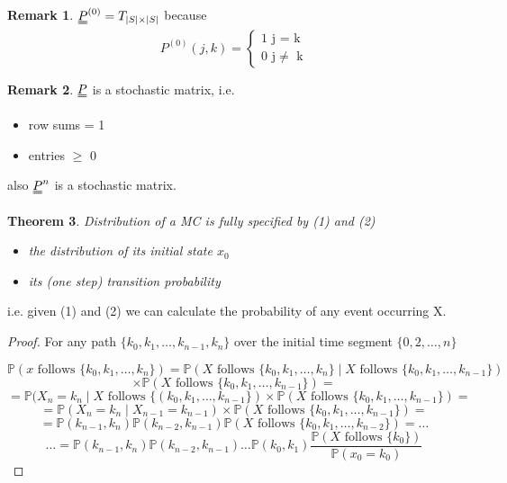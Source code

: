 \documentclass{article}
\newtheorem{thm}{Theorem}
\theoremstyle{definition}
\newtheorem{rem}[thm]{Remark}
\begin{document}
\begin{rem} $\uuline{P}^{(0)} = T_{\mid S \mid \times \mid S \mid}$ because
\[
P^{(0)}(j,k) = \begin{cases} 1 \mbox{ j = k}\\ 0 \mbox{ j} \neq \mbox{ k} \end{cases}
\]
\end{rem}

\begin{rem} $\uuline{P}$ is a stochastic matrix, i.e.
\begin{itemize}
\item
row sums = 1
\item
entries $\geq$ 0
\end{itemize}
also $\uuline{P}^n$ is a stochastic matrix.
\end{rem}

\begin{thm} Distribution of a MC is fully specified by (1) and (2)
\begin{itemize}
\item
the distribution of its initial state $x_0$
\item
its (one step) transition probability
\end{itemize}
\end{thm}

i.e. given (1) and (2) we can calculate the probability of any event occurring X.

\begin{proof} For any path $\{k_0, k_1, \ldots, k_{n-1}, k_n\}$ over the initial time segment $\{0, 2, \ldots, n \}$

\[
\mathbb{P}(x \mbox{ follows } \{k_0, k_1, \ldots, k_n \}) = \mathbb{P}(X \mbox{ follows } \{k_0, k_1, \ldots, k_n \} \mid X \mbox{ follows } \{k_0, k_1, \ldots, k_{n-1} \}) 
\]
\[
\times \mathbb{P}(X \mbox{ follows } \{k_0, k_1, \ldots, k_{n-1} \}) =
\]
\[
= \mathbb{P}(X_n = k_n \mid X \mbox{ follows } \{(k_0, k_1, \ldots, k_{n-1} \}) \times \mathbb{P}(X \mbox{ follows } \{ k_0, k_1, \ldots, k_{n-1} \} ) =
\]
\[ = \mathbb{P}(X_n = k_n \mid X_{n-1} = k_{n-1} ) \times \mathbb{P}(X \mbox{ follows } \{k_0, k_1, \ldots, k_{n-1} \}) =
\]
\[
= \mathbb{P}(k_{n-1}, k_{n} ) \mathbb{P}(k_{n-2}, k_{n-1}) \mathbb{P}(X \mbox{ follows } \{ k_0, k_1, \ldots, k_{n-2} \}) = \ldots
\]
\[
\ldots = \mathbb{P}(k_{n-1}, k_{n} ) \mathbb{P}(k_{n-2}, k_{n-1}) \ldots \mathbb{P}(k_0, k_1) \frac{\mathbb{P}(X \mbox{ follows } \{k_0\})}{\mathbb{P} (x_0 = k_0)}
\]
\end{proof}
\end{document}
